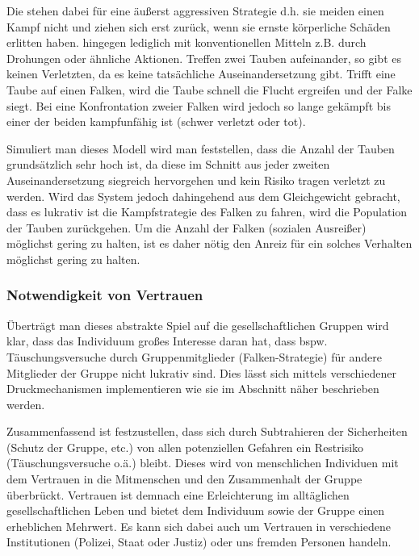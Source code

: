 Die  stehen dabei für eine äußerst aggressiven Strategie d.h. sie meiden einen Kampf nicht und ziehen sich erst zurück, wenn sie ernste körperliche Schäden erlitten haben.
 hingegen  lediglich mit konventionellen Mitteln z.B. durch Drohungen oder ähnliche Aktionen.
Treffen zwei Tauben aufeinander, so gibt es keinen Verletzten, da es keine tatsächliche Auseinandersetzung gibt.
Trifft eine Taube auf einen Falken, wird die Taube schnell die Flucht ergreifen und der Falke siegt.
Bei eine Konfrontation zweier Falken wird jedoch so lange gekämpft bis einer der beiden kampfunfähig ist (schwer verletzt oder tot).

Simuliert man dieses Modell wird man feststellen, dass die Anzahl der Tauben grundsätzlich sehr hoch ist, da diese im Schnitt aus jeder zweiten Auseinandersetzung siegreich hervorgehen und kein Risiko tragen verletzt zu werden.
Wird das System jedoch dahingehend aus dem Gleichgewicht gebracht, dass es lukrativ ist die Kampfstrategie des Falken zu fahren, wird die Population der Tauben zurückgehen.
Um die Anzahl der Falken (sozialen Ausreißer) möglichst gering zu halten, ist es daher nötig den Anreiz für ein solches Verhalten möglichst gering zu halten.
\citep{tauben-falken}

\subsubsection{Notwendigkeit von Vertrauen}\label{sec:notwendigkeit-von-vertauen}
Überträgt man dieses abstrakte Spiel auf die gesellschaftlichen Gruppen wird klar, dass das Individuum großes Interesse daran hat, dass bspw. Täuschungsversuche durch Gruppenmitglieder (Falken-Strategie) für andere Mitglieder der Gruppe nicht lukrativ sind.
Dies lässt sich mittels verschiedener Druckmechanismen implementieren wie sie im Abschnitt  näher beschrieben werden.

Zusammenfassend ist festzustellen, dass sich durch Subtrahieren der Sicherheiten (Schutz der Gruppe, etc.) von allen potenziellen Gefahren ein Restrisiko (Täuschungsversuche o.ä.) bleibt.
Dieses wird von menschlichen Individuen mit dem Vertrauen in die Mitmenschen und den Zusammenhalt der Gruppe überbrückt.
Vertrauen ist demnach eine Erleichterung im alltäglichen gesellschaftlichen Leben und bietet dem Individuum sowie der Gruppe einen erheblichen Mehrwert.
Es kann sich dabei auch um Vertrauen in verschiedene Institutionen (Polizei, Staat oder Justiz) oder uns fremden Personen handeln.
\citep{liars-and-outliers}

